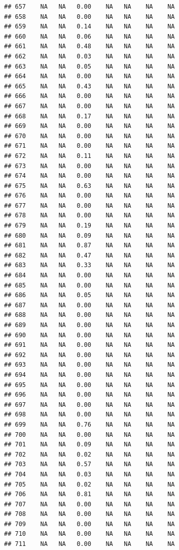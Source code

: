 \documentclass{article}\usepackage{graphicx, color}
\makeatletter
\newenvironment{kframe}{%
 \def\at@end@of@kframe{}%
 \ifinner\ifhmode%
  \def\at@end@of@kframe{\end{minipage}}%
  \begin{minipage}{\columnwidth}%
 \fi\fi%
 \def\FrameCommand##1{\hskip\@totalleftmargin \hskip-\fboxsep
 \colorbox{shadecolor}{##1}\hskip-\fboxsep
     \hskip-\linewidth \hskip-\@totalleftmargin \hskip\columnwidth}%
 \MakeFramed {\advance\hsize-\width
   \@totalleftmargin\z@ \linewidth\hsize
   \@setminipage}}%
 {\par\unskip\endMakeFramed%
 \at@end@of@kframe}
\newenvironment{knitrout}{}{} %
\makeatother
\begin{document}
\begin{knitrout}
\begin{kframe}
\begin{verbatim}
## 657    NA   NA   0.00    NA   NA    NA    NA
## 658    NA   NA   0.00    NA   NA    NA    NA
## 659    NA   NA   0.14    NA   NA    NA    NA
## 660    NA   NA   0.06    NA   NA    NA    NA
## 661    NA   NA   0.48    NA   NA    NA    NA
## 662    NA   NA   0.03    NA   NA    NA    NA
## 663    NA   NA   0.05    NA   NA    NA    NA
## 664    NA   NA   0.00    NA   NA    NA    NA
## 665    NA   NA   0.43    NA   NA    NA    NA
## 666    NA   NA   0.00    NA   NA    NA    NA
## 667    NA   NA   0.00    NA   NA    NA    NA
## 668    NA   NA   0.17    NA   NA    NA    NA
## 669    NA   NA   0.00    NA   NA    NA    NA
## 670    NA   NA   0.00    NA   NA    NA    NA
## 671    NA   NA   0.00    NA   NA    NA    NA
## 672    NA   NA   0.11    NA   NA    NA    NA
## 673    NA   NA   0.00    NA   NA    NA    NA
## 674    NA   NA   0.00    NA   NA    NA    NA
## 675    NA   NA   0.63    NA   NA    NA    NA
## 676    NA   NA   0.00    NA   NA    NA    NA
## 677    NA   NA   0.00    NA   NA    NA    NA
## 678    NA   NA   0.00    NA   NA    NA    NA
## 679    NA   NA   0.19    NA   NA    NA    NA
## 680    NA   NA   0.09    NA   NA    NA    NA
## 681    NA   NA   0.87    NA   NA    NA    NA
## 682    NA   NA   0.47    NA   NA    NA    NA
## 683    NA   NA   0.33    NA   NA    NA    NA
## 684    NA   NA   0.00    NA   NA    NA    NA
## 685    NA   NA   0.00    NA   NA    NA    NA
## 686    NA   NA   0.05    NA   NA    NA    NA
## 687    NA   NA   0.00    NA   NA    NA    NA
## 688    NA   NA   0.00    NA   NA    NA    NA
## 689    NA   NA   0.00    NA   NA    NA    NA
## 690    NA   NA   0.00    NA   NA    NA    NA
## 691    NA   NA   0.00    NA   NA    NA    NA
## 692    NA   NA   0.00    NA   NA    NA    NA
## 693    NA   NA   0.00    NA   NA    NA    NA
## 694    NA   NA   0.00    NA   NA    NA    NA
## 695    NA   NA   0.00    NA   NA    NA    NA
## 696    NA   NA   0.00    NA   NA    NA    NA
## 697    NA   NA   0.00    NA   NA    NA    NA
## 698    NA   NA   0.00    NA   NA    NA    NA
## 699    NA   NA   0.76    NA   NA    NA    NA
## 700    NA   NA   0.00    NA   NA    NA    NA
## 701    NA   NA   0.09    NA   NA    NA    NA
## 702    NA   NA   0.02    NA   NA    NA    NA
## 703    NA   NA   0.57    NA   NA    NA    NA
## 704    NA   NA   0.03    NA   NA    NA    NA
## 705    NA   NA   0.02    NA   NA    NA    NA
## 706    NA   NA   0.81    NA   NA    NA    NA
## 707    NA   NA   0.00    NA   NA    NA    NA
## 708    NA   NA   0.00    NA   NA    NA    NA
## 709    NA   NA   0.00    NA   NA    NA    NA
## 710    NA   NA   0.00    NA   NA    NA    NA
## 711    NA   NA   0.00    NA   NA    NA    NA

\end{verbatim}
\end{kframe}
\end{knitrout}
\end{document}
